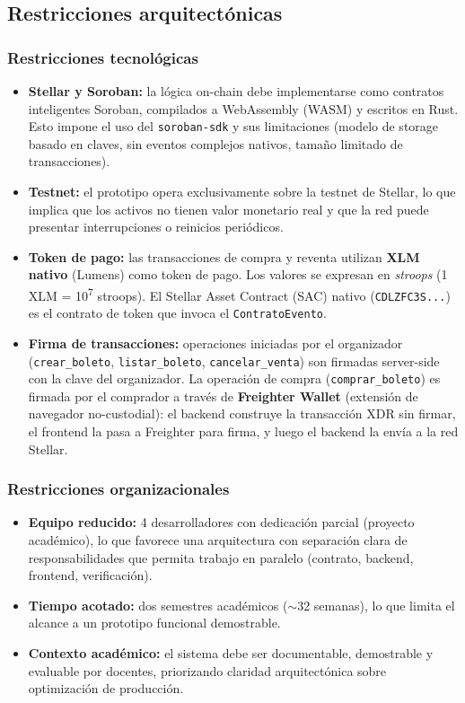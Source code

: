 \documentclass[12pt,oneside]{article}
\begin{document}
\subsection{Restricciones arquitectónicas}
\label{subsec:restricciones}

\subsubsection{Restricciones tecnológicas}

\begin{itemize}
  \item \textbf{Stellar y Soroban:} la lógica on-chain debe implementarse como contratos inteligentes Soroban, compilados a WebAssembly (WASM) y escritos en Rust. Esto impone el uso del \texttt{soroban-sdk} y sus limitaciones (modelo de storage basado en claves, sin eventos complejos nativos, tamaño limitado de transacciones).
  \item \textbf{Testnet:} el prototipo opera exclusivamente sobre la testnet de Stellar, lo que implica que los activos no tienen valor monetario real y que la red puede presentar interrupciones o reinicios periódicos.
  \item \textbf{Token de pago:} las transacciones de compra y reventa utilizan \textbf{XLM nativo} (Lumens) como token de pago. Los valores se expresan en \textit{stroops} (1 XLM = 10\textsuperscript{7} stroops). El Stellar Asset Contract (SAC) nativo (\texttt{CDLZFC3S...}) es el contrato de token que invoca el \texttt{ContratoEvento}.
  \item \textbf{Firma de transacciones:} operaciones iniciadas por el organizador (\texttt{crear\_boleto}, \texttt{listar\_boleto}, \texttt{cancelar\_venta}) son firmadas server-side con la clave del organizador. La operación de compra (\texttt{comprar\_boleto}) es firmada por el comprador a través de \textbf{Freighter Wallet} (extensión de navegador no-custodial): el backend construye la transacción XDR sin firmar, el frontend la pasa a Freighter para firma, y luego el backend la envía a la red Stellar.
\end{itemize}

\subsubsection{Restricciones organizacionales}

\begin{itemize}
  \item \textbf{Equipo reducido:} 4 desarrolladores con dedicación parcial (proyecto académico), lo que favorece una arquitectura con separación clara de responsabilidades que permita trabajo en paralelo (contrato, backend, frontend, verificación).
  \item \textbf{Tiempo acotado:} dos semestres académicos ($\sim$32 semanas), lo que limita el alcance a un prototipo funcional demostrable.
  \item \textbf{Contexto académico:} el sistema debe ser documentable, demostrable y evaluable por docentes, priorizando claridad arquitectónica sobre optimización de producción.
\end{itemize}
\end{document}
